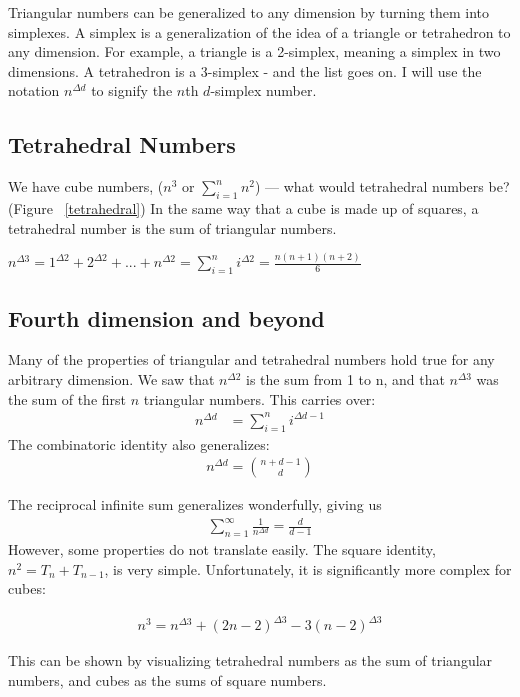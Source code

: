 \documentclass{article}
\newcommand{\tri}[2] {#1^{\Delta #2}}
\begin{document}
Triangular numbers can be generalized to any dimension by turning them into simplexes. A simplex is a generalization of the idea of a triangle or tetrahedron to any dimension. For example, a triangle is a 2-simplex, meaning a simplex in two dimensions. A tetrahedron is a 3-simplex - and the list goes on. I will use the notation $\tri{n}{d}$ to signify the $n$th $d$-simplex number.

\subsection{Tetrahedral Numbers}
We have cube numbers, ($n^3$ or $\sum_{i=1}^{n}n^2$) --- what would tetrahedral numbers be? (Figure ~\ref{tetrahedral}) In the same way that a cube is made up of squares, a tetrahedral number is the sum of triangular numbers.

$\tri{n}{3} = \tri{1}{2}+\tri{2}{2}+...+\tri{n}{2} = \sum_{i=1}^n \tri{i}{2} = \frac{n(n+1)(n+2)}{6}$

\subsection{Fourth dimension and beyond}
Many of the properties of triangular and tetrahedral numbers hold true for any arbitrary dimension. We saw that $\tri{n}{2}$ is the sum from 1 to n, and that $\tri{n}{3}$ was the sum of the first $n$ triangular numbers. This carries over:
\begin{align*}
\tri{n}{d} &= \sum_{i=1}^n \tri{i}{d-1}
\end{align*}
The combinatoric identity also generalizes:
\begin{align*}
 \tri{n}{d} = \binom{n+d-1}{d}
 \end{align*}
 
 The reciprocal infinite sum generalizes wonderfully, giving us
 \begin{align*}
 \sum_{n=1}^{\infty} \frac{1}{\tri{n}{d}} = \frac{d}{d-1}
  \end{align*}
 However, some properties do not translate easily. The square identity, $n^2 = T_n + T_{n-1}$, is very simple. Unfortunately, it is significantly more complex for cubes:
 
 \begin{align*}
 n^3 = \tri{n}{3} + \tri{(2n-2)}{3} - 3 \tri{(n-2)}{3}
 \end{align*}
 
 This can be shown by visualizing tetrahedral numbers as the sum of triangular numbers, and cubes as the sums of square numbers.\\
\end{document}
